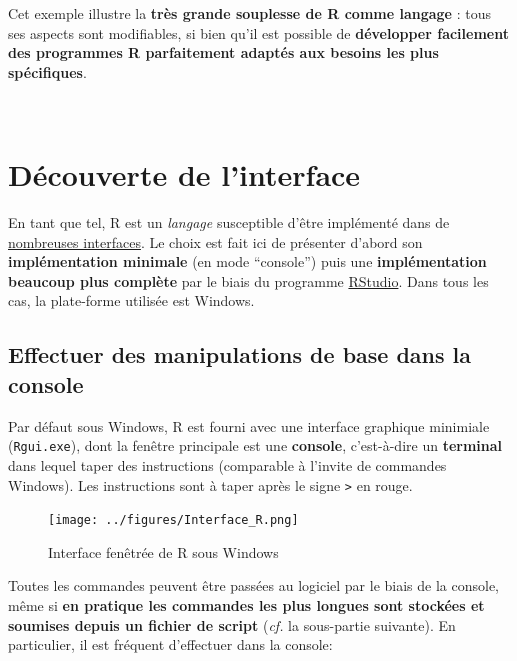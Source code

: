 \documentclass[12pt,twosided, notitlepage]{book}
\begin{document}
Cet exemple illustre la \textbf{très grande souplesse de R comme
langage} : tous ses aspects sont modifiables, si bien qu'il est possible
de \textbf{développer facilement des programmes R parfaitement adaptés
aux besoins les plus spécifiques}.

~

\section{Découverte de l'interface}\label{decouverte-de-linterface}

En tant que tel, R est un \emph{langage} susceptible d'être implémenté
dans de
\href{https://fr.wikipedia.org/wiki/R_(langage)\#Interfaces}{nombreuses
interfaces}. Le choix est fait ici de présenter d'abord son
\textbf{implémentation minimale} (en mode \enquote{console}) puis une
\textbf{implémentation beaucoup plus complète} par le biais du programme
\href{https://www.rstudio.com/}{RStudio}. Dans tous les cas, la
plate-forme utilisée est Windows.

\subsection{Effectuer des manipulations de base dans la
console}\label{effectuer-des-manipulations-de-base-dans-la-console}

Par défaut sous Windows, R est fourni avec une interface graphique
minimiale (\texttt{Rgui.exe}), dont la fenêtre principale est une
\textbf{console}, c'est-à-dire un \textbf{terminal} dans lequel taper
des instructions (comparable à l'invite de commandes Windows). Les
instructions sont à taper après le signe \texttt{\textgreater{}} en
rouge.

\begin{figure}
\centering
\texttt{[image: ../figures/Interface\_R.png]}
\caption{Interface fenêtrée de R sous Windows}
\end{figure}

Toutes les commandes peuvent être passées au logiciel par le biais de la
console, même si \textbf{en pratique les commandes les plus longues sont
stockées et soumises depuis un fichier de script} (\emph{cf.} la
sous-partie suivante). En particulier, il est fréquent d'effectuer dans
la console:
\end{document}
